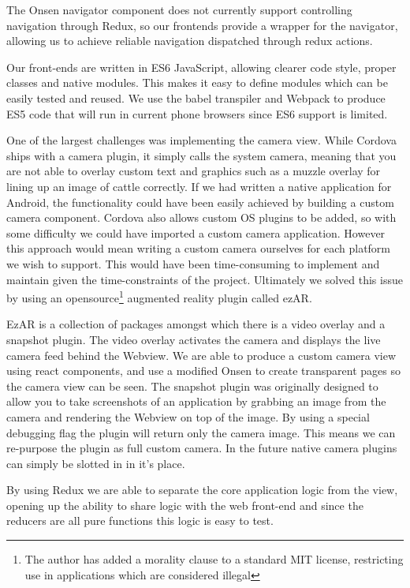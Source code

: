 The Onsen navigator component does not currently support controlling navigation through Redux, so our frontends provide a wrapper for the navigator, allowing us to achieve reliable navigation dispatched through redux actions. 

Our front-ends are written in ES6 JavaScript, allowing clearer code style, proper classes and native modules. This makes it easy to define modules which can be easily tested and reused. We use the babel transpiler and Webpack to produce ES5 code that will run in current phone browsers since ES6 support is limited. 
 
One of the largest challenges was implementing the camera view. While Cordova ships with a camera plugin, it simply calls the system camera, meaning that you are not able to overlay custom text and graphics such as a muzzle overlay for lining up an image of cattle correctly. If we had written a native application for Android, the functionality could have been easily achieved by building a custom camera component. Cordova also allows custom OS plugins to be added, so with some difficulty we could have imported a custom camera application. However this approach would mean writing a custom camera ourselves for each platform we wish to support. This would have been time-consuming to implement and maintain given the time-constraints of the project. Ultimately we solved this issue by using an opensource\footnote{The author has added a morality clause to a standard MIT license, restricting use in applications which are considered illegal}  augmented reality plugin called ezAR. 

EzAR is a collection of packages amongst which there is a video overlay and a snapshot plugin. The video overlay activates the camera and displays the live camera feed behind the Webview. We are able to produce a custom camera view using react components, and use a modified Onsen to create transparent pages so the camera view can be seen. The snapshot plugin was originally designed to allow you to take screenshots of an application by grabbing an image from the camera and rendering the Webview on top of the image. By using a special debugging flag the plugin will return only the camera image. This means we can re-purpose the plugin as full custom camera. In the future native camera plugins can simply be slotted in in it's place.

By using Redux we are able to separate the core application logic from the view, opening up the ability to share logic with the web front-end and since the reducers are all pure functions this logic is easy to test.



